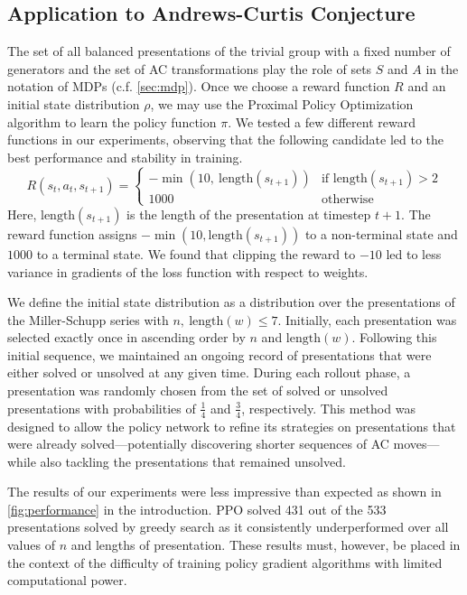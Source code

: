 \subsection{Application to Andrews-Curtis Conjecture} \label{sec:application}

The set of all balanced presentations of the trivial group with a fixed number of generators and the set of AC transformations play the role of sets $S$ and $A$ in the notation of MDPs (c.f. \autoref{sec:mdp}). Once we choose a reward function $R$ and an initial state distribution $\rho$, we may use the Proximal Policy Optimization algorithm to learn the policy function $\pi$. We tested a few different reward functions in our experiments, observing that the following candidate led to the best performance and stability in training.
\[
R(s_{t}, a_{t}, s_{t+1}) = 
\begin{cases} 
-\min(10, \ \text{length}(s_{t+1})) & \text{if length}(s_{t+1}) > 2 \\
1000 & \text{otherwise } 
\end{cases}
\]
Here, $\text{length}(s_{t+1})$ is the length of the presentation at timestep $t+1$. The reward function assigns $-\min(10, \text{length}(s_{t+1}))$ to a non-terminal state and $1000$ to a terminal state. We found that clipping the reward to $-10$ led to less variance in gradients of the loss function with respect to weights.
\newline

We define the initial state distribution as a distribution over the presentations of the Miller-Schupp series with $n, \ \text{length}(w) \leq 7$. Initially, each presentation was selected exactly once in ascending order by $n$ and $\text{length}(w)$. Following this initial sequence, we maintained an ongoing record of presentations that were either solved or unsolved at any given time. During each rollout phase, a presentation was randomly chosen from the set of solved or unsolved presentations with probabilities of  $\frac{1}{4}$ and $\frac{3}{4}$, respectively. This method was designed to allow the policy network to refine its strategies on presentations that were already solved—potentially discovering shorter sequences of AC moves—while also tackling the presentations that remained unsolved.
\newline

The results of our experiments were less impressive than expected as shown in \autoref{fig:performance} in the introduction. PPO solved 431 out of the 533 presentations solved by greedy search as it consistently underperformed over all values of $n$ and lengths of presentation. These results must, however, be placed in the context of the difficulty of training policy gradient algorithms with limited computational power.

